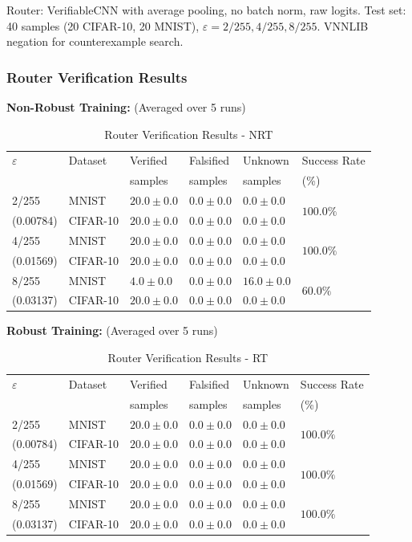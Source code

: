 \documentclass[11pt,a4paper]{article}
\begin{document}
Router: VerifiableCNN with average pooling, no batch norm, raw logits. Test set: 40 samples (20 CIFAR-10, 20 MNIST), $\varepsilon = 2/255, 4/255, 8/255$. VNNLIB negation for counterexample search.

\subsubsection{Router Verification Results}

\textbf{Non-Robust Training:} (Averaged over 5 runs)

\begin{table}[H]
\centering
\small
\begin{tabular}{llllll}
\toprule
$\varepsilon$ & Dataset & Verified & Falsified & Unknown & Success Rate \\
 & & samples & samples & samples & (\%) \\
\midrule
2/255 & MNIST & $20.0 \pm 0.0$ & $0.0 \pm 0.0$ & $0.0 \pm 0.0$ & \multirow{2}{*}{$100.0\%$} \\
(0.00784) & CIFAR-10 & $20.0 \pm 0.0$ & $0.0 \pm 0.0$ & $0.0 \pm 0.0$ & \\
4/255 & MNIST & $20.0 \pm 0.0$ & $0.0 \pm 0.0$ & $0.0 \pm 0.0$ & \multirow{2}{*}{$100.0\%$} \\
(0.01569) & CIFAR-10 & $20.0 \pm 0.0$ & $0.0 \pm 0.0$ & $0.0 \pm 0.0$ & \\
8/255 & MNIST & $4.0 \pm 0.0$ & $0.0 \pm 0.0$ & $16.0 \pm 0.0$ & \multirow{2}{*}{$60.0\%$} \\
(0.03137) & CIFAR-10 & $20.0 \pm 0.0$ & $0.0 \pm 0.0$ & $0.0 \pm 0.0$ & \\
\bottomrule
\end{tabular}
\caption{Router Verification Results - NRT}
\end{table}

\textbf{Robust Training:} (Averaged over 5 runs)

\begin{table}[H]
\centering
\small
\begin{tabular}{llllll}
\toprule
$\varepsilon$ & Dataset & Verified & Falsified & Unknown & Success Rate \\
 & & samples & samples & samples & (\%) \\
\midrule
2/255 & MNIST & $20.0 \pm 0.0$ & $0.0 \pm 0.0$ & $0.0 \pm 0.0$ & \multirow{2}{*}{$100.0\%$} \\
(0.00784) & CIFAR-10 & $20.0 \pm 0.0$ & $0.0 \pm 0.0$ & $0.0 \pm 0.0$ & \\
4/255 & MNIST & $20.0 \pm 0.0$ & $0.0 \pm 0.0$ & $0.0 \pm 0.0$ & \multirow{2}{*}{$100.0\%$} \\
(0.01569) & CIFAR-10 & $20.0 \pm 0.0$ & $0.0 \pm 0.0$ & $0.0 \pm 0.0$ & \\
8/255 & MNIST & $20.0 \pm 0.0$ & $0.0 \pm 0.0$ & $0.0 \pm 0.0$ & \multirow{2}{*}{$100.0\%$} \\
(0.03137) & CIFAR-10 & $20.0 \pm 0.0$ & $0.0 \pm 0.0$ & $0.0 \pm 0.0$ & \\
\bottomrule
\end{tabular}
\caption{Router Verification Results - RT}
\end{table}
\end{document}
